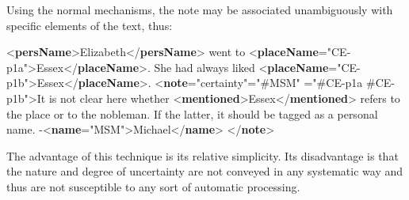 Using the normal mechanisms, the note may be associated unambiguously with specific elements of the text, thus: \par\bgroup{}\exampleFont \begin{shaded}\noindent\mbox{}{<\textbf{persName}>}Elizabeth{</\textbf{persName}>} went to {<\textbf{placeName}\hspace*{1em}{xml:id}="{CE-p1a}">}Essex{</\textbf{placeName}>}.\mbox{}\newline 
 She had always liked {<\textbf{placeName}\hspace*{1em}{xml:id}="{CE-p1b}">}Essex{</\textbf{placeName}>}.\mbox{}\newline 
{<\textbf{note}\hspace*{1em}{type}="{certainty}"\hspace*{1em}{resp}="{\#MSM}"\mbox{}\newline 
\hspace*{1em}{target}="{\#CE-p1a \#CE-p1b}">}It\mbox{}\newline 
 is not clear here whether {<\textbf{mentioned}>}Essex{</\textbf{mentioned}>}\mbox{}\newline 
 refers to the place or to the nobleman. If the latter,\mbox{}\newline 
 it should be tagged as a personal name. -{<\textbf{name}\hspace*{1em}{xml:id}="{MSM}">}Michael{</\textbf{name}>}\mbox{}\newline 
{</\textbf{note}>}\end{shaded}\egroup\par \par
The advantage of this technique is its relative simplicity. Its disadvantage is that the nature and degree of uncertainty are not conveyed in any systematic way and thus are not susceptible to any sort of automatic processing.
